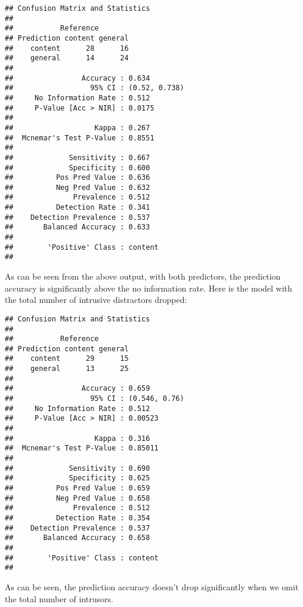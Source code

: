 \documentclass[11pt,]{article}
\begin{document}
\begin{verbatim}
## Confusion Matrix and Statistics
## 
##           Reference
## Prediction content general
##    content      28      16
##    general      14      24
##                                        
##                Accuracy : 0.634        
##                  95% CI : (0.52, 0.738)
##     No Information Rate : 0.512        
##     P-Value [Acc > NIR] : 0.0175       
##                                        
##                   Kappa : 0.267        
##  Mcnemar's Test P-Value : 0.8551       
##                                        
##             Sensitivity : 0.667        
##             Specificity : 0.600        
##          Pos Pred Value : 0.636        
##          Neg Pred Value : 0.632        
##              Prevalence : 0.512        
##          Detection Rate : 0.341        
##    Detection Prevalence : 0.537        
##       Balanced Accuracy : 0.633        
##                                        
##        'Positive' Class : content      
## 
\end{verbatim}

As can be seen from the above output, with both predictors, the
prediction accuracy is significantly above the no information rate. Here
is the model with the total number of intrusive distractors dropped:

\begin{verbatim}
## Confusion Matrix and Statistics
## 
##           Reference
## Prediction content general
##    content      29      15
##    general      13      25
##                                        
##                Accuracy : 0.659        
##                  95% CI : (0.546, 0.76)
##     No Information Rate : 0.512        
##     P-Value [Acc > NIR] : 0.00523      
##                                        
##                   Kappa : 0.316        
##  Mcnemar's Test P-Value : 0.85011      
##                                        
##             Sensitivity : 0.690        
##             Specificity : 0.625        
##          Pos Pred Value : 0.659        
##          Neg Pred Value : 0.658        
##              Prevalence : 0.512        
##          Detection Rate : 0.354        
##    Detection Prevalence : 0.537        
##       Balanced Accuracy : 0.658        
##                                        
##        'Positive' Class : content      
## 
\end{verbatim}

As can be seen, the prediction accuracy doesn't drop significantly when
we omit the total number of intrusors.
\end{document}
